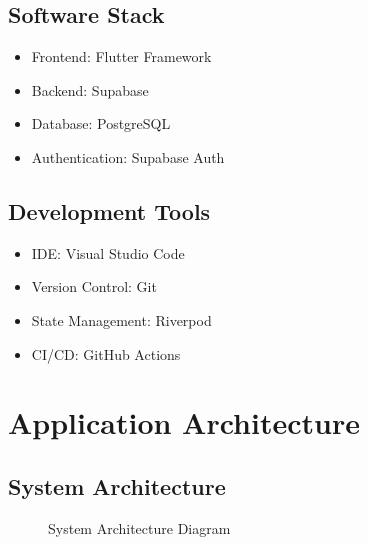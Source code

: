 \documentclass[12pt,a4paper]{report}
\begin{document}
\section{Software Stack}
\begin{itemize}
    \item Frontend: Flutter Framework
    \item Backend: Supabase
    \item Database: PostgreSQL
    \item Authentication: Supabase Auth
\end{itemize}

\section{Development Tools}
\begin{itemize}
    \item IDE: Visual Studio Code
    \item Version Control: Git
    \item State Management: Riverpod
    \item CI/CD: GitHub Actions
\end{itemize}

\chapter{Application Architecture}
\section{System Architecture}
\begin{figure}[H]
    \centering
    \caption{System Architecture Diagram}
    \label{fig:system_architecture}
\end{figure}
\end{document}
